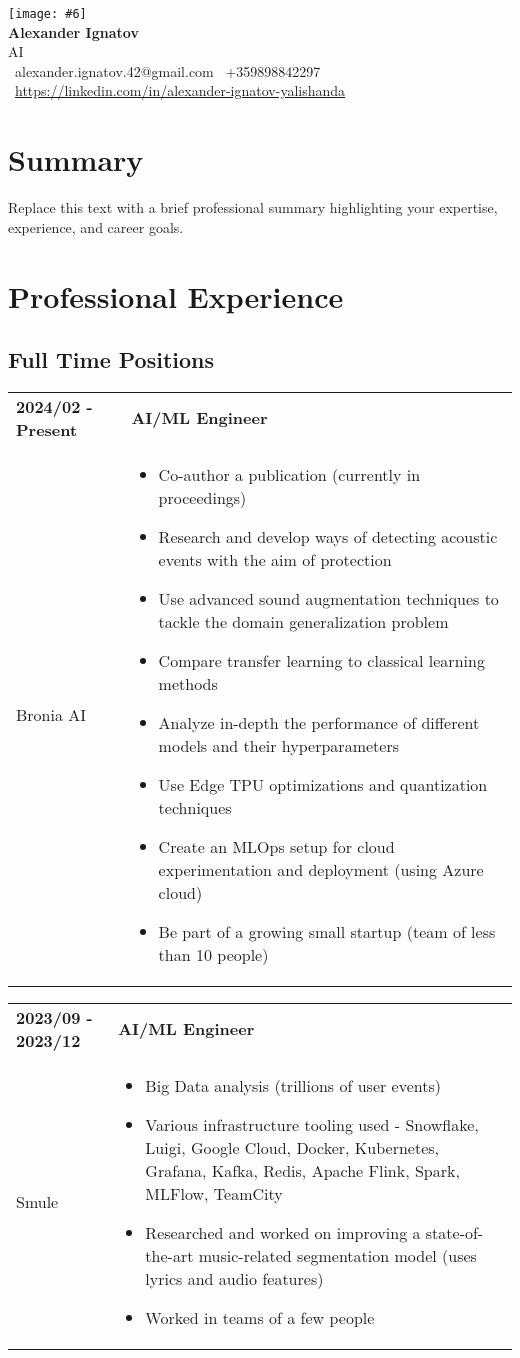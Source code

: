\documentclass[11pt,a4paper]{article}
\newcommand{\cvheader}[6]{
    \begin{center}
        \texttt{[image: \#6]} \\[4pt]
            {\Huge\textbf{#1}}\\[4pt]
            {\large #2}\\[2pt]
            \faEnvelope\ #3 \quad \faPhone\ #4 \\[2pt]
            \faLinkedin\ \href{#5}{#5}
    \end{center}
}
\newcommand{\workblock}[4]{
    \begin{tabular}{p{0.25\columnwidth}p{0.65\columnwidth}}
        \textbf{#1} & \textbf{#2} \\
        #3 & #4 \\
    \end{tabular}
}
\begin{document}
\cvheader{Alexander Ignatov}
         {AI}
         {alexander.ignatov.42@gmail.com}
         {+359898842297}
         {https://linkedin.com/in/alexander-ignatov-yalishanda}
         {az.jpg}


\section{Summary}
Replace this text with a brief professional summary highlighting your expertise, experience, and career goals.
    

\section{Professional Experience}
    \subsection{Full Time Positions}
    \workblock{2024/02 - Present}{AI/ML Engineer}
    {Bronia AI}{
        \begin{itemize}
            \item Co-author a publication (currently in proceedings)
            \item Research and develop ways of detecting acoustic events with the aim of protection
            \item Use advanced sound augmentation techniques to tackle the domain generalization problem
            \item Compare transfer learning to classical learning methods
            \item Analyze in-depth the performance of different models and their hyperparameters
            \item Use Edge TPU optimizations and quantization techniques
            \item Create an MLOps setup for cloud experimentation and deployment (using Azure cloud)
            \item Be part of a growing small startup (team of less than 10 people)
        \end{itemize}
    }

    \workblock{2023/09 - 2023/12}{AI/ML Engineer}
    {Smule}{
        \begin{itemize}
            \item Big Data analysis (trillions of user events)
            \item Various infrastructure tooling used - Snowflake, Luigi, Google Cloud, Docker, Kubernetes, Grafana, Kafka, Redis, Apache Flink, Spark, MLFlow, TeamCity
            \item Researched and worked on improving a state-of-the-art music-related segmentation model (uses lyrics and audio features)
            \item Worked in teams of a few people
        \end{itemize}
    }
    
\end{document}
